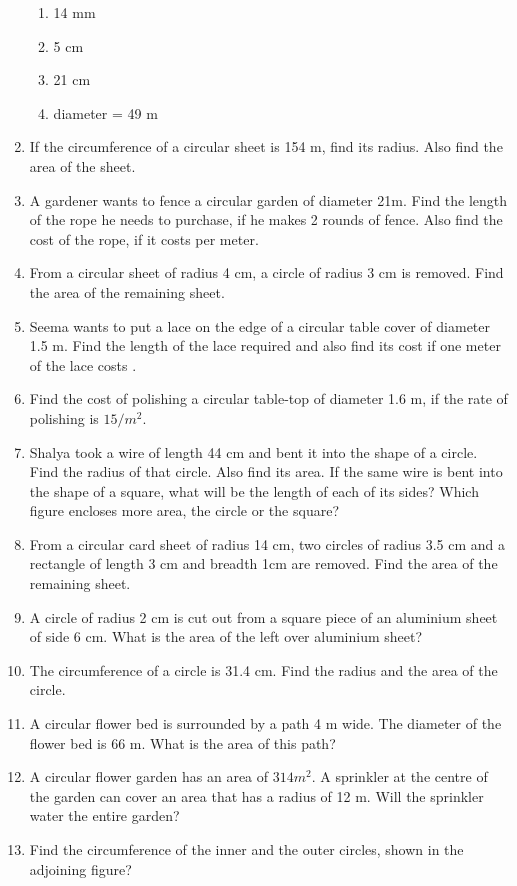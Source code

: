 \begin{enumerate}[label=\thesection.\arabic*, ref=\thesection.\theenumi]
\begin{enumerate}
\item 14 mm 
\item 5 cm
\item 21 cm 
\item  diameter = 49 m
\end{enumerate}
\item If the circumference of a circular sheet is 154 m, find its radius. Also find the area of the sheet. 
\item A gardener wants to fence a circular garden of diameter 21m. Find the length of the rope he needs to purchase, if he makes 2 rounds of fence. Also find the cost of the rope, if it costs  per meter. 
\item  From a circular sheet of radius 4 cm, a circle of radius 3 cm is removed. Find the area of the remaining sheet. 
\item Seema wants to put a lace on the edge of a circular table cover of diameter 1.5 m. Find the length of the lace required and also find its cost if one meter of the lace costs
. 
\item Find the cost of polishing a circular table-top of diameter 1.6 m, if the rate of polishing is \rupee $15/m^2$. 
\item Shalya took a wire of length 44 cm and bent it into the shape of a circle. Find the radius of that circle. Also find its area. If the same wire is bent into the shape of a square, what will be the length of each of its sides? Which figure encloses more
area, the circle or the square? 
\item From a circular card sheet of radius 14 cm, two circles of radius 3.5 cm and a rectangle of length 3 cm and breadth 1cm are removed. 
 Find the area of the remaining sheet. 
\item A circle of radius 2 cm is cut out from a square piece of an aluminium sheet of side 6 cm. What is the area of the left over aluminium sheet? 
\item  The circumference of a circle is 31.4 cm. Find the radius and the area of the circle. 
\item A circular flower bed is surrounded by a path 4 m wide. The diameter of the flower bed is 66 m. What is the area of this path? 
\item A circular flower garden has an area of $314 m^2$. A sprinkler at the centre of the garden can cover an area that has a radius of 12 m. Will the sprinkler water the entire garden? 
\item Find the circumference of the inner and the outer circles, shown in the adjoining figure? 

\end{enumerate}
